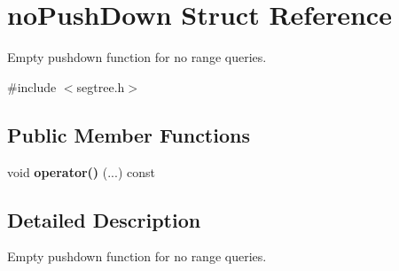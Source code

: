 \hypertarget{structno_push_down}{}\section{no\+Push\+Down Struct Reference}
\label{structno_push_down}


Empty pushdown function for no range queries.  




{\ttfamily \#include $<$segtree.\+h$>$}

\subsection*{Public Member Functions}
\begin{DoxyCompactItemize}
\item 
\mbox{\label{structno_push_down_abbfb04a9467d50b7dd5d05c168203aa1}} 
void {\bfseries operator()} (...) const
\end{DoxyCompactItemize}


\subsection{Detailed Description}
Empty pushdown function for no range queries. 